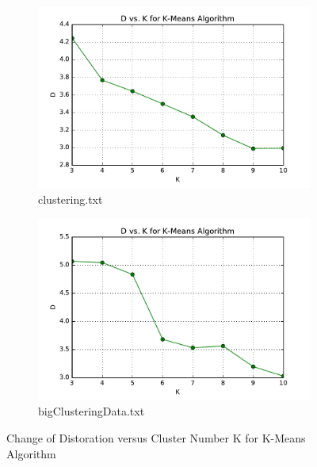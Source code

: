 \begin{description}
\begin{figure}[H]
\centering
\centering
        \begin{subfigure}[b]{0.49\textwidth}
            \centering
            \includegraphics[width=\textwidth]{./figures/loss_clustering_kMeans.pdf}
            \caption{clustering.txt}\label{fig:3a}
        \end{subfigure}
        \hfill
        \begin{subfigure}[b]{0.49\textwidth}  
            \centering 
            \includegraphics[width=\textwidth]{./figures/loss_bigClustering_kMeans.pdf}
            \caption{bigClusteringData.txt}\label{fig:3b}
        \end{subfigure}
\caption{Change of Distoration versus Cluster Number K for K-Means Algorithm}
\label{fig:k-means-loss} 
\end{figure}

\end{description}

